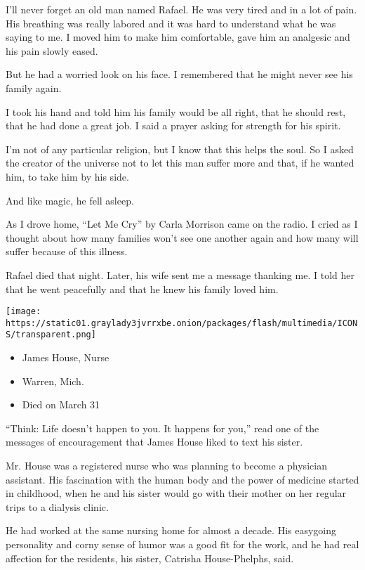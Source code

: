 I'll never forget an old man named Rafael. He was very tired and in a
lot of pain. His breathing was really labored and it was hard to
understand what he was saying to me. I moved him to make him
comfortable, gave him an analgesic and his pain slowly eased.

But he had a worried look on his face. I remembered that he might never
see his family again.

I took his hand and told him his family would be all right, that he
should rest, that he had done a great job. I said a prayer asking for
strength for his spirit.

I'm not of any particular religion, but I know that this helps the soul.
So I asked the creator of the universe not to let this man suffer more
and that, if he wanted him, to take him by his side.

And like magic, he fell asleep.

As I drove home, ``Let Me Cry'' by Carla Morrison came on the radio. I
cried as I thought about how many families won't see one another again
and how many will suffer because of this illness.

Rafael died that night. Later, his wife sent me a message thanking me. I
told her that he went peacefully and that he knew his family loved him.

\texttt{[image: https://static01.graylady3jvrrxbe.onion/packages/flash/multimedia/ICONS/transparent.png]}

\begin{itemize}
\tightlist
\item
  James House, Nurse
\item
  Warren, Mich.
\item
  Died on March 31
\end{itemize}

``Think: Life doesn't happen to you. It happens for you,'' read one of
the messages of encouragement that James House liked to text his sister.

Mr. House was a registered nurse who was planning to become a physician
assistant. His fascination with the human body and the power of medicine
started in childhood, when he and his sister would go with their mother
on her regular trips to a dialysis clinic.

He had worked at the same nursing home for almost a decade. His
easygoing personality and corny sense of humor was a good fit for the
work, and he had real affection for the residents, his sister, Catrisha
House-Phelphs, said.

